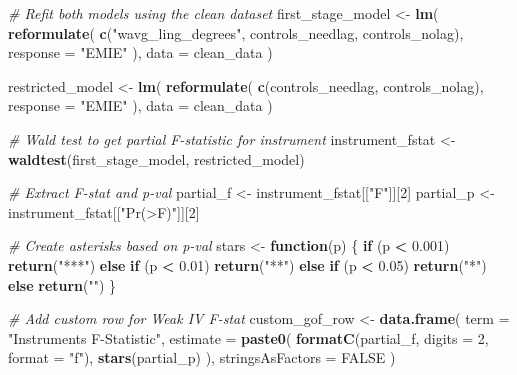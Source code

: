 \documentclass[
]{article}
\newenvironment{Shaded}{\begin{snugshade}}{\end{snugshade}}
\newcommand{\AttributeTok}[1]{\textcolor[rgb]{0.13,0.29,0.53}{#1}}
\newcommand{\CommentTok}[1]{\textcolor[rgb]{0.56,0.35,0.01}{\textit{#1}}}
\newcommand{\ConstantTok}[1]{\textcolor[rgb]{0.56,0.35,0.01}{#1}}
\newcommand{\ControlFlowTok}[1]{\textcolor[rgb]{0.13,0.29,0.53}{\textbf{#1}}}
\newcommand{\DecValTok}[1]{\textcolor[rgb]{0.00,0.00,0.81}{#1}}
\newcommand{\FloatTok}[1]{\textcolor[rgb]{0.00,0.00,0.81}{#1}}
\newcommand{\FunctionTok}[1]{\textcolor[rgb]{0.13,0.29,0.53}{\textbf{#1}}}
\newcommand{\NormalTok}[1]{#1}
\newcommand{\OtherTok}[1]{\textcolor[rgb]{0.56,0.35,0.01}{#1}}
\newcommand{\SpecialCharTok}[1]{\textcolor[rgb]{0.81,0.36,0.00}{\textbf{#1}}}
\newcommand{\StringTok}[1]{\textcolor[rgb]{0.31,0.60,0.02}{#1}}
\begin{document}
\begin{Shaded}
\begin{Highlighting}[]
\CommentTok{\# Refit both models using the clean dataset}
\NormalTok{first\_stage\_model }\OtherTok{\textless{}{-}} \FunctionTok{lm}\NormalTok{(}
    \FunctionTok{reformulate}\NormalTok{(}
        \FunctionTok{c}\NormalTok{(}\StringTok{"wavg\_ling\_degrees"}\NormalTok{, controls\_needlag, controls\_nolag),}
        \AttributeTok{response =} \StringTok{"EMIE"}
\NormalTok{    ),}
    \AttributeTok{data =}\NormalTok{ clean\_data}
\NormalTok{)}

\NormalTok{restricted\_model }\OtherTok{\textless{}{-}} \FunctionTok{lm}\NormalTok{(}
    \FunctionTok{reformulate}\NormalTok{(}
        \FunctionTok{c}\NormalTok{(controls\_needlag, controls\_nolag),}
        \AttributeTok{response =} \StringTok{"EMIE"}
\NormalTok{    ),}
    \AttributeTok{data =}\NormalTok{ clean\_data}
\NormalTok{)}

\CommentTok{\# Wald test to get partial F{-}statistic for instrument}
\NormalTok{instrument\_fstat }\OtherTok{\textless{}{-}} \FunctionTok{waldtest}\NormalTok{(first\_stage\_model, restricted\_model)}


\CommentTok{\# Extract F{-}stat and p{-}val}
\NormalTok{partial\_f }\OtherTok{\textless{}{-}}\NormalTok{ instrument\_fstat[[}\StringTok{"F"}\NormalTok{]][}\DecValTok{2}\NormalTok{]}
\NormalTok{partial\_p }\OtherTok{\textless{}{-}}\NormalTok{ instrument\_fstat[[}\StringTok{"Pr(\textgreater{}F)"}\NormalTok{]][}\DecValTok{2}\NormalTok{]}

\CommentTok{\# Create asterisks based on p{-}val}
\NormalTok{stars }\OtherTok{\textless{}{-}} \ControlFlowTok{function}\NormalTok{(p) \{}
    \ControlFlowTok{if}\NormalTok{ (p }\SpecialCharTok{\textless{}} \FloatTok{0.001}\NormalTok{)}
        \FunctionTok{return}\NormalTok{(}\StringTok{"***"}\NormalTok{) }\ControlFlowTok{else} \ControlFlowTok{if}\NormalTok{ (p }\SpecialCharTok{\textless{}} \FloatTok{0.01}\NormalTok{)}
        \FunctionTok{return}\NormalTok{(}\StringTok{"**"}\NormalTok{) }\ControlFlowTok{else} \ControlFlowTok{if}\NormalTok{ (p }\SpecialCharTok{\textless{}} \FloatTok{0.05}\NormalTok{)}
        \FunctionTok{return}\NormalTok{(}\StringTok{"*"}\NormalTok{) }\ControlFlowTok{else} \FunctionTok{return}\NormalTok{(}\StringTok{""}\NormalTok{)}
\NormalTok{\}}

\CommentTok{\# Add custom row for Weak IV F{-}stat}
\NormalTok{custom\_gof\_row }\OtherTok{\textless{}{-}} \FunctionTok{data.frame}\NormalTok{(}
    \AttributeTok{term =} \StringTok{"Instrument\textquotesingle{}s F{-}Statistic"}\NormalTok{, }\AttributeTok{estimate =} \FunctionTok{paste0}\NormalTok{(}
        \FunctionTok{formatC}\NormalTok{(partial\_f, }\AttributeTok{digits =} \DecValTok{2}\NormalTok{, }\AttributeTok{format =} \StringTok{"f"}\NormalTok{),}
        \FunctionTok{stars}\NormalTok{(partial\_p)}
\NormalTok{    ),}
    \AttributeTok{stringsAsFactors =} \ConstantTok{FALSE}
\NormalTok{)}



\end{Highlighting}
\end{Shaded}
\end{document}
